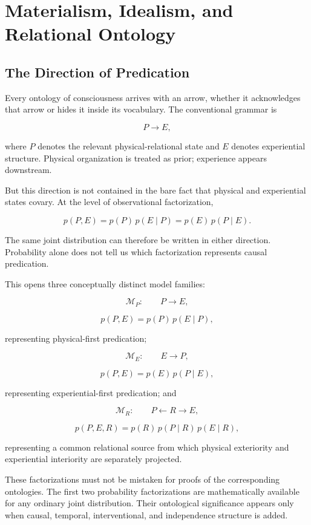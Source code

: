 \chapter{Materialism, Idealism, and Relational Ontology}

\section{The Direction of Predication}

Every ontology of consciousness arrives with an arrow, whether it acknowledges that arrow or hides it inside its vocabulary. The conventional grammar is

\[
P \longrightarrow E,
\]

where $P$ denotes the relevant physical-relational state and $E$ denotes experiential structure. Physical organization is treated as prior; experience appears downstream.

But this direction is not contained in the bare fact that physical and experiential states covary. At the level of observational factorization,

\[
p(P,E)
=
p(P)\,p(E\mid P)
=
p(E)\,p(P\mid E).
\]

The same joint distribution can therefore be written in either direction. Probability alone does not tell us which factorization represents causal predication.

This opens three conceptually distinct model families:

\[
\mathcal M_P:
\qquad
P\longrightarrow E,
\]

\[
p(P,E)
=
p(P)\,p(E\mid P),
\]

representing physical-first predication;

\[
\mathcal M_E:
\qquad
E\longrightarrow P,
\]

\[
p(P,E)
=
p(E)\,p(P\mid E),
\]

representing experiential-first predication; and

\[
\mathcal M_R:
\qquad
P\longleftarrow R\longrightarrow E,
\]

\[
p(P,E,R)
=
p(R)\,p(P\mid R)\,p(E\mid R),
\]

representing a common relational source from which physical exteriority and experiential interiority are separately projected.

These factorizations must not be mistaken for proofs of the corresponding ontologies. The first two probability factorizations are mathematically available for any ordinary joint distribution. Their ontological significance appears only when causal, temporal, interventional, and independence structure is added.

